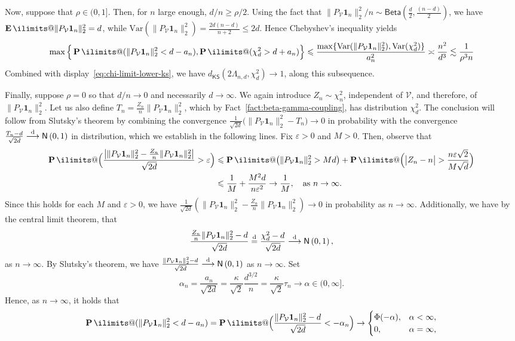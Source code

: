 \documentclass[11pt, letterpaper, hidelinks]{article}
\makeatletter
\newcommand{\cV}{\mathcal{V}}
\newcommand{\1}{\mathbf 1}
\newcommand{\eps}{\varepsilon}
\renewcommand{\leq}{\leqslant}
\renewcommand{\geq}{\geqslant}
\newcommand{\distto}{\stackrel{\rm d}{\longrightarrow}}
\newcommand{\Var}{\mathrm{Var}}
\newcommand{\E}{\operatorname*{\mathbf{E}}\ilimits@}
\renewcommand{\P}{\operatorname*{\mathbf{P}}\ilimits@}
\theoremstyle{plain}
\theoremstyle{definition}
\newcommand{\Normal}[2]{\mathsf{N}\left(#1, #2\right)}
\newcommand{\defn}{=}
\newcommand{\KSDist}[2]{d_{\mathsf{KS}}\left(#1, #2\right)}
\makeatother
\begin{document}
	Now, suppose that $\rho \in (0, 1]$. 
	Then, for $n$ large enough, $d/n \geq \rho/2$. 
	Using the fact that ${\|P_\cV \1_n\|_2^2/n \sim \mathsf{Beta}(\tfrac{d}{2},\tfrac{(n-d)}{2})}$, we have
	$\E\|P_\cV \1_n\|_2^2=d$, while $\Var(\|P_\cV \1_n\|_2^2)=\frac{2d(n-d)}{n+2}\leq 2d$. 
	Hence Chebyshev's inequality yields
		\[
		\max\Big\{\P(\|P_\cV \1_n\|_2^2<d-a_n), \P(\chi^2_d > d + a_n)\Big\} 
	\leq
	\frac{\max\{\Var(\|P_\cV \1_n\|_2^2), \Var(\chi^2_d)\}}{a_n^2}
	\asymp 
	\frac{n^2}{d^3} 
	\lesssim \frac{1}{\rho^3 n}
\] 
Combined with display~\cref{eq:chi-limit-lower-ks}, we have 
$\KSDist{2\Lambda_{n,d}}{\chi^2_d}\to 1$, along this subsequence.

Finally, suppose $\rho = 0$ so that $d/n\to 0$ and necessarily $d \to \infty$. 
We again introduce $Z_n\sim\chi^2_n$, independent of $\cV$, and therefore, of $\|P_\cV\1_n\|_2^2$. Let us also define $T_n\defn\tfrac{Z_n}{n}\|P_\cV\1_n\|_2^2$, which by Fact~\ref{fact:beta-gamma-coupling}, has distribution $\chi^2_d$. The conclusion will follow from Slutsky's theorem by combining the convergence $\tfrac{1}{\sqrt{2d}}\bigl(\|P_\cV\1_n\|_2^2-T_n\bigr)\to0$ in probability with the convergence $\tfrac{T_n-d}{\sqrt{2d}}\distto\Normal{0}{1}$ in distribution, which we establish in the following lines. 
Fix $\eps>0$ and $M>0$. Then, observe that 
\begin{align}
\P\Big(\frac{\big|\|P_\cV \1_n\|_2^2-\tfrac{Z_n}{n}\|P_\cV \1_n\|_2^2\big|}{\sqrt{2d}}>\eps\Big)
&\leq
\P\big(\|P_\cV \1_n\|_2^2>Md\big)
+
\P\Big(\big|Z_n - n\big|>\frac{n\eps\sqrt{2}}{M\sqrt{d}}\Big) \\ 
&\leq \frac{1}{M} + \frac{M^2d}{n \eps^2} \to \frac{1}{M}, \quad \mbox{as $n \to \infty$.}
\end{align}
Since this holds for each $M$ and $\eps> 0$, we have 
$\tfrac{1}{\sqrt{2d}}(\|P_\cV \1_n\|_2^2-\tfrac{Z_n}{n}\|P_\cV \1_n\|_2^2)
\to 0$ in probability as $n \to \infty$. 
Additionally, we have by the central limit theorem, that 
\[
\frac{\tfrac{Z_n}{n}\|P_\cV \1_n\|_2^2-d}{\sqrt{2d}}
\overset{\rm{d}}{=}
\frac{\chi^2_d-d}{\sqrt{2d}}
\distto 
\Normal{0}{1},
\]
as $n \to \infty$. 
By Slutsky's theorem, we have $\tfrac{\|P_\cV \1_n\|_2^2-d}{\sqrt{2d}} \distto \Normal{0}{1}$ as $n \to \infty$. 
Set
\[
\alpha_n \defn \frac{a_n}{\sqrt{2d}}
=
\frac{\kappa}{\sqrt{2}}\frac{d^{3/2}}{n}
=
\frac{\kappa}{\sqrt{2}}\tau_n
\to \alpha\in (0, \infty].
\]
Hence, as $n \to \infty$, it holds that 
\[
\P(\|P_\cV \1_n\|_2^2<d-a_n)
=
\P\Bigl(\frac{\|P_\cV \1_n\|_2^2-d}{\sqrt{2d}}<-\alpha_n\Bigr)
\to
\begin{cases}
\Phi(-\alpha), & \alpha<\infty,\\
0, & \alpha=\infty,
\end{cases}
\]
\end{document}
